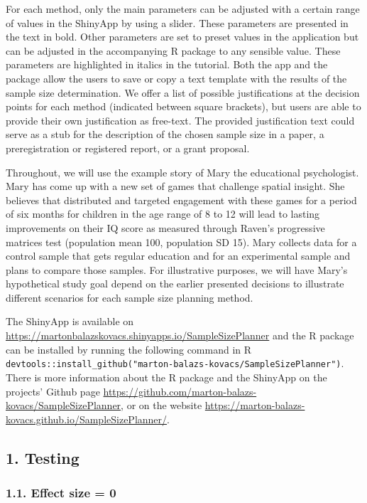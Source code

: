 \documentclass[
  english,
  man,floatsintext]{apa6}
\begin{document}
For each method, only the main parameters can be adjusted with a certain range of values in the ShinyApp by using a slider. These parameters are presented in the text in bold. Other parameters are set to preset values in the application but can be adjusted in the accompanying R package to any sensible value. These parameters are highlighted in italics in the tutorial. Both the app and the package allow the users to save or copy a text template with the results of the sample size determination. We offer a list of possible justifications at the decision points for each method (indicated between square brackets), but users are able to provide their own justification as free-text. The provided justification text could serve as a stub for the description of the chosen sample size in a paper, a preregistration or registered report, or a grant proposal.

Throughout, we will use the example story of Mary the educational psychologist. Mary has come up with a new set of games that challenge spatial insight. She believes that distributed and targeted engagement with these games for a period of six months for children in the age range of 8 to 12 will lead to lasting improvements on their IQ score as measured through Raven's progressive matrices test (population mean 100, population SD 15). Mary collects data for a control sample that gets regular education and for an experimental sample and plans to compare those samples. For illustrative purposes, we will have Mary's hypothetical study goal depend on the earlier presented decisions to illustrate different scenarios for each sample size planning method.

The ShinyApp is available on \url{https://martonbalazskovacs.shinyapps.io/SampleSizePlanner} and the R package can be installed by running the following command in R \texttt{devtools::install\_github("marton-balazs-kovacs/SampleSizePlanner")}. There is more information about the R package and the ShinyApp on the projects' Github page \url{https://github.com/marton-balazs-kovacs/SampleSizePlanner}, or on the website \url{https://marton-balazs-kovacs.github.io/SampleSizePlanner/}.

\hypertarget{testing}{%
\subsection{1. Testing}\label{testing}}

\hypertarget{effect-size-0}{%
\subsubsection{1.1. Effect size = 0}\label{effect-size-0}}
\end{document}
